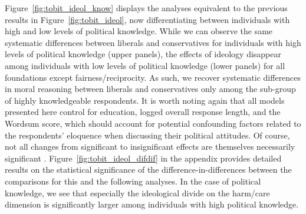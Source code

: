 \documentclass[12pt]{article}
\begin{document}
Figure~\ref{fig:tobit_ideol_know} displays the analyses equivalent to the previous results in Figure~\ref{fig:tobit_ideol}, now differentiating between individuals with high and low levels of political knowledge. While we can observe the same systematic differences between liberals and conservatives for individuals with high levels of political knowledge (upper panels), the effects of ideology disappear among individuals with low levels of political knowledge (lower panels) for all foundations except fairness/reciprocity. As such, we recover systematic differences in moral reasoning between liberals and conservatives only among the sub-group of highly knowledgeable respondents. It is worth noting again that all models presented here control for education, logged overall response length, and the Wordsum score, which should account for potential confounding factors related to the respondents' eloquence when discussing their political attitudes. Of course, not all changes from significant to insignificant effects are themselves necessarily significant \citep[c.f.,][]{gelman2006difference}. Figure~\ref{fig:tobit_ideol_difdif} in the appendix provides detailed results on the statistical significance of the difference-in-differences between the comparisons for this and the following analyses. In the case of political knowledge, we see that especially the ideological divide on the harm/care dimension is significantly larger among individuals with high political knowledge.
\end{document}
